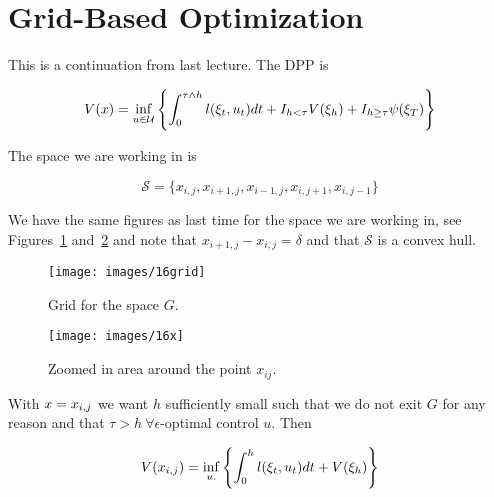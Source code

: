 \mainmatter%
\setcounter{page}{1}

\lectureseries[\course]{\course}

\date{December 1, 2009}

\setaddress%

\setcounter{lecture}{16}
\setcounter{chapter}{16}


\section{Grid-Based Optimization}
This is a continuation from last lecture.
The DPP is

\begin{equation*}
V(x) = \inf_{u\in\mathcal{U}}\left\lbrace \int_0^{\tau\wedge h}l(\xi_t,u_t)dt + I_{h<\tau}V(\xi_h) + I_{h\geq\tau}\psi(\xi_T) \right\rbrace
\end{equation*}

The space we are working in is

\begin{equation*}
\mathcal{S} = \{x_{i,j}, x_{i+1,j}, x_{i-1,j}, x_{i,j+1}, x_{i,j-1}\}
\end{equation*}

We have the same figures as last time for the space we are working in, see Figures~\ref{fig:17grid} and~\ref{fig:17x} and note that $x_{i+1,j}-x_{i,j}=\delta$ and that $\mathcal{S}$ is a convex hull.

\begin{figure}[ht!]
\centering
\texttt{[image: images/16grid]}
\caption{Grid for the space $G$.}%
\label{fig:17grid}
\end{figure}

\begin{figure}[ht!]
\centering
\texttt{[image: images/16x]}
\caption{Zoomed in area around the point $x_{ij}$.}%
\label{fig:17x}
\end{figure}

With $x=x_{i,j}$ we want $h$ sufficiently small such that we do not exit $G$ for any reason and that $\tau>h~\forall \epsilon$-optimal control $u$.
Then

\begin{equation*}
V(x_{i,j}) = \inf_{u.}\left\lbrace \int_0^h l(\xi_t,u_t)dt + V(\xi_h) \right\rbrace
\end{equation*}

